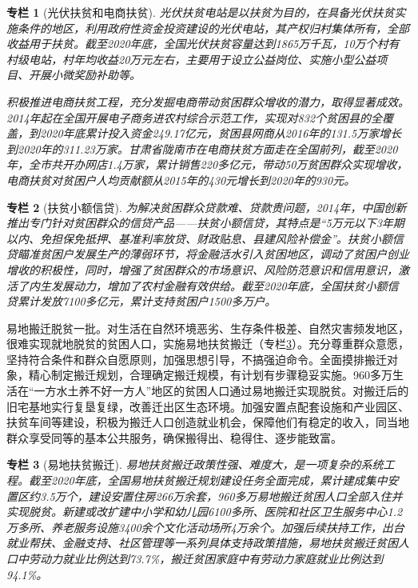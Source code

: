 \documentclass{ctexart}
\newtheorem{zhuanlan}{专栏}
\begin{document}
\begin{zhuanlan}[光伏扶贫和电商扶贫]
    光伏扶贫电站是以扶贫为目的，在具备光伏扶贫实施条件的地区，利用政府性资金投资建设的光伏电站，其产权归村集体所有，全部收益用于扶贫。截至2020年底，全国光伏扶贫容量达到1865万千瓦，10万个村有村级电站，村年均收益20万元左右，主要用于设立公益岗位、实施小型公益项目、开展小微奖励补助等。
    
    积极推进电商扶贫工程，充分发掘电商带动贫困群众增收的潜力，取得显著成效。2014年起在全国开展电子商务进农村综合示范工作，实现对832个贫困县的全覆盖，到2020年底累计投入资金249.17亿元，贫困县网商从2016年的131.5万家增长到2020年的311.23万家。甘肃省陇南市在电商扶贫方面走在全国前列，截至2020年，全市共开办网店1.4万家，累计销售220多亿元，带动50万贫困群众实现增收，电商扶贫对贫困户人均贡献额从2015年的430元增长到2020年的930元。
    \label{col-7}
\end{zhuanlan}

\begin{zhuanlan}[扶贫小额信贷]
    为解决贫困群众贷款难、贷款贵问题，2014年，中国创新推出专门针对贫困群众的信贷产品——扶贫小额信贷，其特点是“5万元以下3年期以内、免担保免抵押、基准利率放贷、财政贴息、县建风险补偿金”。扶贫小额信贷瞄准贫困户发展生产的薄弱环节，将金融活水引入贫困地区，调动了贫困户创业增收的积极性，同时，增强了贫困群众的市场意识、风险防范意识和信用意识，激活了内生发展动力，增加了农村金融有效供给。截至2020年底，全国扶贫小额信贷累计发放7100多亿元，累计支持贫困户1500多万户。
    \label{col-8}
\end{zhuanlan}

易地搬迁脱贫一批。对生活在自然环境恶劣、生存条件极差、自然灾害频发地区，很难实现就地脱贫的贫困人口，实施易地扶贫搬迁（专栏\ref{col-9}）。充分尊重群众意愿，坚持符合条件和群众自愿原则，加强思想引导，不搞强迫命令。全面摸排搬迁对象，精心制定搬迁规划，合理确定搬迁规模，有计划有步骤稳妥实施。960多万生活在“一方水土养不好一方人”地区的贫困人口通过易地搬迁实现脱贫。对搬迁后的旧宅基地实行复垦复绿，改善迁出区生态环境。加强安置点配套设施和产业园区、扶贫车间等建设，积极为搬迁人口创造就业机会，保障他们有稳定的收入，同当地群众享受同等的基本公共服务，确保搬得出、稳得住、逐步能致富。

\begin{zhuanlan}[易地扶贫搬迁]
    易地扶贫搬迁政策性强、难度大，是一项复杂的系统工程。截至2020年底，全国易地扶贫搬迁规划建设任务全面完成，累计建成集中安置区约3.5万个，建设安置住房266万余套，960多万易地搬迁贫困人口全部入住并实现脱贫。新建或改扩建中小学和幼儿园6100多所、医院和社区卫生服务中心1.2万多所、养老服务设施3400余个文化活动场所4万余个。加强后续扶持工作，出台就业帮扶、金融支持、社区管理等一系列具体支持政策措施，易地扶贫搬迁贫困人口中劳动力就业比例达到73.7\%，搬迁贫困家庭中有劳动力家庭就业比例达到94.1\%。
    \label{col-9}
\end{zhuanlan}
\end{document}
